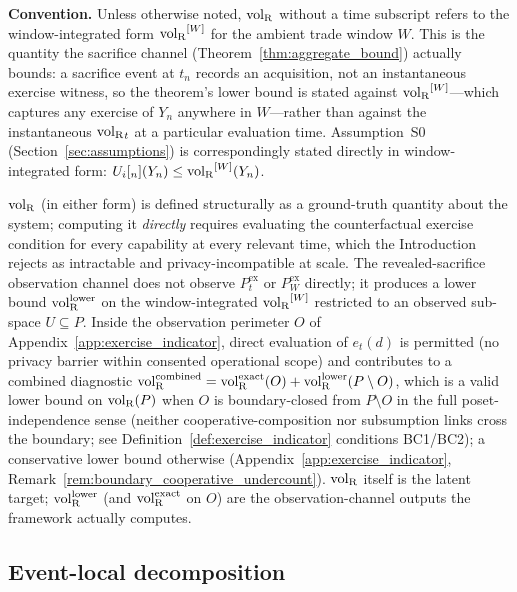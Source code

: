 \begin{definition}
\medskip\noindent
\textbf{Convention.}
Unless otherwise noted, ${\operatorname{vol}_{\mathrm{R}}}$ without a time subscript refers
to the window-integrated form ${\operatorname{vol}_{\mathrm{R}}}^{[W]}$ for the ambient
trade window $W$.  This is the quantity the sacrifice channel
(Theorem~\ref{thm:aggregate_bound}) actually bounds: a sacrifice
event at $t_n$ records an acquisition, not an instantaneous
exercise witness, so the theorem's lower bound is stated
against ${\operatorname{vol}_{\mathrm{R}}}^{[W]}$---which captures any exercise of $Y_n$
anywhere in $W$---rather than against the instantaneous
${\operatorname{vol}_{\mathrm{R}}}_{t}$ at a particular evaluation time.  Assumption~S0
(Section~\ref{sec:assumptions}) is correspondingly stated
directly in window-integrated form:
$U_i[_{n}](Y_n) \leq {\operatorname{vol}_{\mathrm{R}}}^{[W]}(Y_n)$.
\end{definition}

\begin{remark}
\label{rem:volR_diagnostic}
${\operatorname{vol}_{\mathrm{R}}}$ (in either form) is defined structurally as a
ground-truth quantity about the system; computing it
\emph{directly} requires evaluating the counterfactual exercise
condition for every capability at every relevant time, which the
Introduction rejects as intractable and privacy-incompatible at
scale.  The revealed-sacrifice observation channel does not
observe $P^{\mathrm{ex}}_t$ or $P^{\mathrm{ex}}_W$ directly; it
produces a lower bound ${\operatorname{vol}_{\mathrm{R}}^{\mathrm{lower}}}$ on the window-integrated
${\operatorname{vol}_{\mathrm{R}}}^{[W]}$ restricted to an observed sub-space
$U \subseteq P$.  Inside the observation perimeter $O$ of
Appendix~\ref{app:exercise_indicator}, direct evaluation of
$e_t(d)$ is permitted (no privacy barrier within consented
operational scope) and contributes to a combined diagnostic
${\operatorname{vol}_{\mathrm{R}}^{\mathrm{combined}}} = {\operatorname{vol}_{\mathrm{R}}^{\mathrm{exact}}}(O) + {\operatorname{vol}_{\mathrm{R}}^{\mathrm{lower}}}(P \setminus O)$, which
is a valid lower bound on ${\operatorname{vol}_{\mathrm{R}}}(P)$ when $O$ is
boundary-closed from $P \setminus O$ in the full
poset-independence sense (neither cooperative-composition nor
subsumption links cross the boundary; see
Definition~\ref{def:exercise_indicator} conditions BC1/BC2); a
conservative lower bound otherwise
(Appendix~\ref{app:exercise_indicator},
Remark~\ref{rem:boundary_cooperative_undercount}).  ${\operatorname{vol}_{\mathrm{R}}}$ itself is the
latent target; ${\operatorname{vol}_{\mathrm{R}}^{\mathrm{lower}}}$ (and ${\operatorname{vol}_{\mathrm{R}}^{\mathrm{exact}}}$ on $O$) are the
observation-channel outputs the framework actually computes.
\end{remark}

\subsection{Event-local decomposition}

